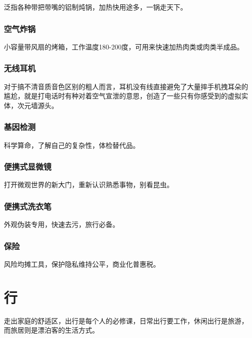 \documentclass[
  letterpaper,
  DIV=11,
  numbers=noendperiod]{scrreprt}
\begin{document}
泛指各种带把带嘴的铝制炖锅，加热快用途多，一锅走天下。

\subsection{空气炸锅}\label{ux7a7aux6c14ux70b8ux9505}

小容量带风扇的烤箱，工作温度180-200度，可用来快速加热肉类或肉类半成品。

\subsection{无线耳机}\label{ux65e0ux7ebfux8033ux673a}

对于搞不清音质音色区别的粗人而言，耳机没有线直接避免了大量摔手机拽耳朵的尴尬，就是打电话时有种对着空气宣泄的意思，创造了一些只有你感受到的虚拟实体，次元墙源头。

\subsection{基因检测}\label{ux57faux56e0ux68c0ux6d4b}

科学算命，了解自己的复杂性，体检替代品。

\subsection{便携式显微镜}\label{ux4fbfux643aux5f0fux663eux5faeux955c}

打开微观世界的新大门，重新认识熟悉事物，别看昆虫。

\subsection{便携式洗衣笔}\label{ux4fbfux643aux5f0fux6d17ux8863ux7b14}

外观伪装专用，快速去污，旅行必备。

\subsection{保险}\label{ux4fddux9669}

风险均摊工具，保护隐私维持公平，商业化普惠税。


\chapter{行}\label{ux884c}

走出家庭的舒适区，出行是每个人的必修课，日常出行要工作，休闲出行是旅游，而旅居则是漂泊客的生活方式。
\end{document}
